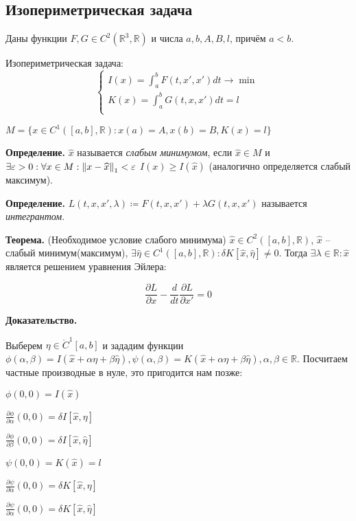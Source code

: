 \subsection{Изопериметрическая задача}

Даны функции $F, G \in C^2(\mathbb{R}^3, \mathbb{R})$ и числа $a,b, A, B, l$, причём $a < b$.

Изопериметрическая задача:
\[
\begin{cases}
    
I(x) = \int_a^b F(t, x', x') dt \to \min\\

K(x) = \int_a^b G(t, x, x') dt = l\\
\end{cases}
\]

$M = \{ x \in C^1([a,b], \mathbb{R}): x(a) = A, x(b) = B, K(x) = l\}$

\textbf{Определение.} $\widehat x$ называется \textit{слабым минимумом}, если $\widehat x \in M$ и $\exists \varepsilon > 0 : \forall x \in M : \left\| x - \widehat{x} \right\|_1 < \varepsilon$ $I(x) \geq I(\widehat x)$
(аналогично определяется слабый максимум).

\textbf{Определение.} $L(t,x,x', \lambda) \coloneq F(t,x,x') + \lambda G(t,x,x')$ называется \textit{интегрантом}.

\textbf{Теорема.} (Необходимое условие слабого минимума) $\widehat x \in C^2([a,b], \mathbb{R})$, $\widehat x$ -- слабый минимум(максимум), $\exists \widehat \eta \in C^1([a,b], \mathbb{R}): \delta K[\widehat x, \widehat \eta] \ne 0$. Тогда $\exists \lambda \in \mathbb{R}: \widehat x$ является решением уравнения Эйлера:

\[
\frac{\partial L}{\partial x} - \frac{d}{dt}\frac{\partial L}{\partial x'} = 0
\]

\textbf{Доказательство.} 

Выберем $\eta \in  \mathring C^1[a, b]$ и зададим функции $\phi(\alpha, \beta) = I(\widehat x + \alpha \eta + \beta \widehat \eta), \psi(\alpha, \beta) = K(\widehat x + \alpha \eta + \beta \widehat \eta), \alpha, \beta \in \mathbb{R}$.
Посчитаем частные производные в нуле, это пригодится нам позже:
\begin{center}
$\phi(0,0) = I(\widehat x)$

$\frac{\partial \phi}{\partial \alpha}(0,0) = \delta I[\widehat x, \eta]$

$\frac{\partial \phi}{\partial \beta}(0,0) = \delta I[\widehat x, \widehat \eta]$

$\psi(0,0) = K(\widehat x) = l$

$\frac{\partial \psi}{\partial \alpha}(0,0) = \delta K[\widehat x, \eta]$

$\frac{\partial \psi}{\partial \alpha}(0,0) = \delta K[\widehat x, \widehat \eta]$
\end{center}

